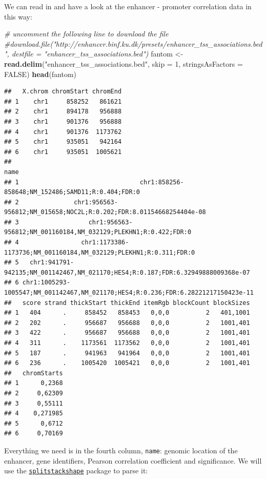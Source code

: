 \documentclass[9pt,a4paper,]{extarticle}
\newenvironment{Shaded}{\begin{snugshade}}{\end{snugshade}}
\newcommand{\KeywordTok}[1]{\textcolor[rgb]{0.13,0.29,0.53}{\textbf{#1}}}
\newcommand{\DataTypeTok}[1]{\textcolor[rgb]{0.13,0.29,0.53}{#1}}
\newcommand{\DecValTok}[1]{\textcolor[rgb]{0.00,0.00,0.81}{#1}}
\newcommand{\StringTok}[1]{\textcolor[rgb]{0.31,0.60,0.02}{#1}}
\newcommand{\CommentTok}[1]{\textcolor[rgb]{0.56,0.35,0.01}{\textit{#1}}}
\newcommand{\OtherTok}[1]{\textcolor[rgb]{0.56,0.35,0.01}{#1}}
\newcommand{\NormalTok}[1]{#1}
\begin{document}
We can read in and have a look at the enhancer - promoter correlation data in this way:

\begin{Shaded}
\begin{Highlighting}[]
\CommentTok{# uncomment the following line to download the file}
\CommentTok{#download.file("http://enhancer.binf.ku.dk/presets/enhancer_tss_associations.bed", destfile = "enhancer_tss_associations.bed")}
\NormalTok{fantom <-}\StringTok{ }\KeywordTok{read.delim}\NormalTok{(}\StringTok{"enhancer_tss_associations.bed"}\NormalTok{, }\DataTypeTok{skip =} \DecValTok{1}\NormalTok{, }\DataTypeTok{stringsAsFactors =} \OtherTok{FALSE}\NormalTok{)}
\KeywordTok{head}\NormalTok{(fantom)}
\end{Highlighting}
\end{Shaded}

\begin{verbatim}
##   X.chrom chromStart chromEnd
## 1    chr1     858252   861621
## 2    chr1     894178   956888
## 3    chr1     901376   956888
## 4    chr1     901376  1173762
## 5    chr1     935051   942164
## 6    chr1     935051  1005621
##                                                                                name
## 1                                 chr1:858256-858648;NM_152486;SAMD11;R:0.404;FDR:0
## 2               chr1:956563-956812;NM_015658;NOC2L;R:0.202;FDR:8.01154668254404e-08
## 3                   chr1:956563-956812;NM_001160184,NM_032129;PLEKHN1;R:0.422;FDR:0
## 4                 chr1:1173386-1173736;NM_001160184,NM_032129;PLEKHN1;R:0.311;FDR:0
## 5   chr1:941791-942135;NM_001142467,NM_021170;HES4;R:0.187;FDR:6.32949888009368e-07
## 6 chr1:1005293-1005547;NM_001142467,NM_021170;HES4;R:0.236;FDR:6.28221217150423e-11
##   score strand thickStart thickEnd itemRgb blockCount blockSizes
## 1   404      .     858452   858453   0,0,0          2   401,1001
## 2   202      .     956687   956688   0,0,0          2   1001,401
## 3   422      .     956687   956688   0,0,0          2   1001,401
## 4   311      .    1173561  1173562   0,0,0          2   1001,401
## 5   187      .     941963   941964   0,0,0          2   1001,401
## 6   236      .    1005420  1005421   0,0,0          2   1001,401
##   chromStarts
## 1      0,2368
## 2     0,62309
## 3     0,55111
## 4    0,271985
## 5      0,6712
## 6     0,70169
\end{verbatim}

Everything we need is in the fourth column, \texttt{name}: genomic location of the enhancer, gene identifiers, Pearson correlation coefficient and significance.
We will use the \href{https://cran.r-project.org/package=splitstackshape}{\texttt{splitstackshape}} package to parse it:
\end{document}
